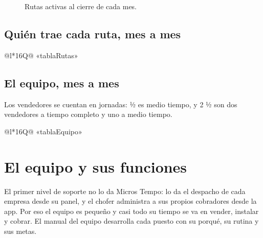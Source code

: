 \documentclass[10.5pt,a4paper]{article}
\begin{document}
\begin{figure}[H]
\caption{Rutas activas al cierre de cada mes.}
\end{figure}

\begin{landscape}
\subsection{Quién trae cada ruta, mes a mes}
{\scriptsize\setlength{\tabcolsep}{3pt}
\begin{tabular}{@{}l*{16}{Q}@{}}
\toprule
«tablaRutas»
\bottomrule
\end{tabular}}

\subsection{El equipo, mes a mes}
Los vendedores se cuentan en jornadas: ½ es medio tiempo, y 2 ½ son dos vendedores a tiempo completo y uno a medio tiempo.

{\scriptsize\setlength{\tabcolsep}{3pt}
\begin{tabular}{@{}l*{16}{Q}@{}}
\toprule
«tablaEquipo»
\bottomrule
\end{tabular}}
\end{landscape}

\section{El equipo y sus funciones}

El primer nivel de soporte no lo da Micros Tempo: lo da el despacho de cada empresa desde su panel, y el chofer administra a sus propios cobradores desde la app. Por eso el equipo es pequeño y casi todo su tiempo se va en vender, instalar y cobrar. El manual del equipo desarrolla cada puesto con su porqué, su rutina y sus metas.
\end{document}
